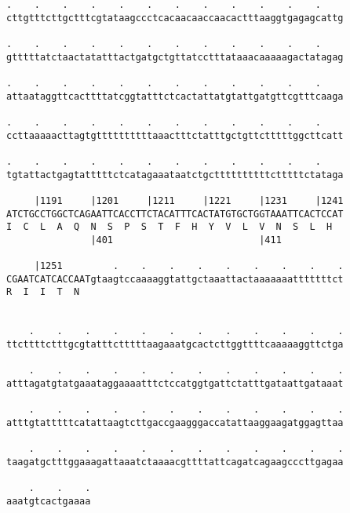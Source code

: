 \documentclass{article}
\begin{document}
\begin{Verbatim}
.    .    .    .    .    .    .    .    .    .    .    .    
cttgtttcttgctttcgtataagccctcacaacaaccaacactttaaggtgagagcattg
                                                            
.    .    .    .    .    .    .    .    .    .    .    .    
gtttttatctaactatatttactgatgctgttatcctttataaacaaaaagactatagag
                                                            
.    .    .    .    .    .    .    .    .    .    .    .    
attaataggttcacttttatcggtatttctcactattatgtattgatgttcgtttcaaga
                                                            
.    .    .    .    .    .    .    .    .    .    .    .    
ccttaaaaacttagtgttttttttttaaactttctatttgctgttctttttggcttcatt
                                                            
.    .    .    .    .    .    .    .    .    .    .    .    
tgtattactgagtatttttctcatagaaataatctgcttttttttttctttttctataga
                                                            
     |1191     |1201     |1211     |1221     |1231     |1241
ATCTGCCTGGCTCAGAATTCACCTTCTACATTTCACTATGTGCTGGTAAATTCACTCCAT
I  C  L  A  Q  N  S  P  S  T  F  H  Y  V  L  V  N  S  L  H  
               |401                          |411           
  
     |1251         .    .    .    .    .    .    .    .    .
CGAATCATCACCAATgtaagtccaaaaggtattgctaaattactaaaaaaatttttttct
R  I  I  T  N                                               
                                                            
  
    .    .    .    .    .    .    .    .    .    .    .    .
ttcttttctttgcgtatttctttttaagaaatgcactcttggttttcaaaaaggttctga
                                                            
    .    .    .    .    .    .    .    .    .    .    .    .
atttagatgtatgaaataggaaaatttctccatggtgattctatttgataattgataaat
                                                            
    .    .    .    .    .    .    .    .    .    .    .    .
atttgtatttttcatattaagtcttgaccgaagggaccatattaaggaagatggagttaa
                                                            
    .    .    .    .    .    .    .    .    .    .    .    .
taagatgctttggaaagattaaatctaaaacgttttattcagatcagaagcccttgagaa
                                                            
    .    .    .
aaatgtcactgaaaa
               

\end{Verbatim}
\end{document}
